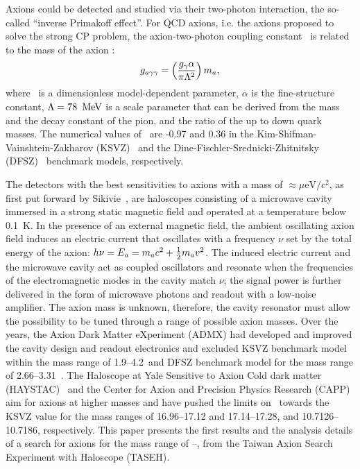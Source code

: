 Axions could be detected and studied via their two-photon interaction, the
so-called ``inverse Primakoff effect''. For QCD axions, i.e. the axions 
proposed to solve the strong CP problem, the axion-two-photon coupling 
constant \gagg\ is related to the mass of the axion \ma: 
\begin{equation}
 g_{a\gamma\gamma} = \left(\frac{g_{\gamma}\alpha}{\pi \Lambda^2}\right)m_a,
\end{equation}
where \ggamma\ is a dimensionless model-dependent parameter, $\alpha$ is the 
fine-structure constant, $\Lambda=78~\,\text{Me\hspace{-.08em}V}$ is a scale parameter that can 
be derived from the mass and the decay constant of the pion, and the ratio of 
the up to down quark masses. 
The numerical values of \ggamma\ are -0.97 and 0.36 
in the Kim-Shifman-Vainshtein-Zakharov (KSVZ)~\cite{KSVZI,KSVZII} and 
the Dine-Fischler-Srednicki-Zhitnitsky (DFSZ)~\cite{DFSZI,DFSZII} benchmark 
models, respectively. 
%
%
% 

The detectors with the best sensitivities to axions with a mass of 
$\approx \mu\mathrm{eV}/c^2$, as first put forward by 
Sikivie~\cite{SikivieI,SikivieII},  
are haloscopes consisting of a microwave cavity immersed in a strong static 
magnetic field and operated at a temperature 
below 0.1~K. In the presence of an external magnetic field, the ambient 
oscillating axion field induces an electric current that oscillates with 
a frequency $\nu$ set by the total energy of the axion: 
$h\nu=E_a=m_a c^2 + \frac{1}{2}m_a v^2$. The induced electric current 
and the microwave cavity act as coupled oscillators and resonate when the 
frequencies of the electromagnetic modes in the cavity match $\nu$; the signal 
power is further delivered in the form of microwave photons and 
readout with a low-noise amplifier. The axion mass is unknown, therefore, 
the cavity resonator must allow the possibility to be tuned through a range
of possible axion masses. Over the years, 
the Axion Dark Matter eXperiment (ADMX) had developed and improved the 
cavity design and readout electronics and excluded KSVZ 
benchmark model within the mass range of %
1.9--4.2\muevcc\ and DFSZ benchmark model for the mass range 
of 2.66--3.31\muevcc~\cite{ADMXI,ADMXII,ADMXIII,ADMXIV,ADMXV,ADMXVI,ADMXVII}. 
The Haloscope at Yale Sensitive to Axion Cold dark matter 
(HAYSTAC)~\cite{HAYSTACI} and the 
Center for Axion and Precision Physics Research (CAPP)~\cite{CAPPI} aim for 
axions at higher masses and have pushed the limits on \gagg\ towards the 
KSVZ value for the mass ranges of 16.96--17.12 
and 17.14--17.28\muevcc, and 10.7126--10.7186\muevcc, respectively. This 
paper presents the first results and the analysis details of a search for 
axions for the mass range of \mlo--\mhi\muevcc, from the Taiwan Axion 
Search Experiment with Haloscope (TASEH).  

